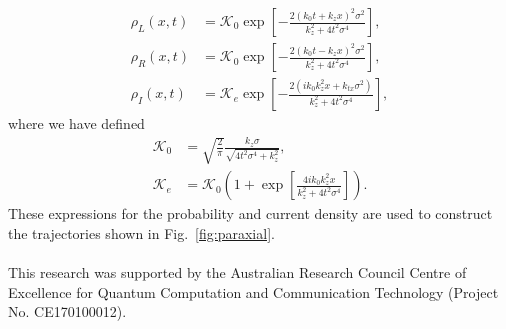 \documentclass[
prx
,twocolumn
,nofootinbib
,floatfix
,superscriptaddress
]{revtex4-2}
\begin{document}
\begin{align}
    \rho_L(x,t) &= \mathcal{K}_0 \exp \left[ -\frac{2(k_0t + k_zx)^2 \sigma^2}{k_z^2 + 4t^2\sigma^4} \right] , \nonumber  \\
    \rho_R (x,t) &= \mathcal{K}_0  \exp \left[ - \frac{2(k_0t - k_zx)^2\sigma^2}{k_z^2 + 4t^2\sigma^4} \right], \nonumber \\
    \rho_I (x,t) &= \mathcal{K}_e  \exp \left[ - \frac{2(ik_0k_z^2 x + k_{tx}\sigma^2)}{k_z^2 + 4t^2 \sigma^4} \right] ,
\end{align}
where we have defined 
\begin{align}
    \mathcal{K}_0 &= \sqrt{\frac{2}{\pi}} \frac{k_z\sigma}{\sqrt{4t^2\sigma^4 + k_z^2}}  , \nonumber \\
    \mathcal{K}_e &= \mathcal{K}_0 \left( 1 + \exp \left[ \frac{4ik_0 k_z^2x}{k_z^2 + 4t^2\sigma^4} \right] \right) .
\end{align}
These expressions for the probability and current density are used to construct the trajectories shown in Fig.\ \ref{fig:paraxial}. 
\\\\

\acknowledgements
This research was supported by the Australian Research Council Centre of Excellence for Quantum Computation and Communication Technology (Project
No. CE170100012).

 
\end{document}
